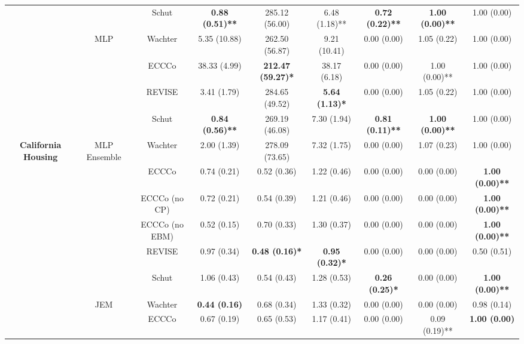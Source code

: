 \begin{table}
{\begin{tabular}[t]{>{}c|c|c|c|c|c|c|c|c}
 &  & Schut & \textbf{0.88 (0.51)**} & 285.12 (56.00) & 6.48 (1.18)** & \textbf{0.72 (0.22)**} & \textbf{1.00 (0.00)**} & 1.00 (0.00)\\

 & \multirow{-4}{*}{\centering\arraybackslash MLP} & Wachter & 5.35 (10.88) & 262.50 (56.87) & 9.21 (10.41) & 0.00 (0.00) & 1.05 (0.22) & 1.00 (0.00)\\
\cline{2-9}
 &  & ECCCo & 38.33 (4.99) & \textbf{212.47 (59.27)*} & 38.17 (6.18) & 0.00 (0.00) & 1.00 (0.00)** & 1.00 (0.00)\\

 &  & REVISE & 3.41 (1.79) & 284.65 (49.52) & \textbf{5.64 (1.13)*} & 0.00 (0.00) & 1.05 (0.22) & 1.00 (0.00)\\

 &  & Schut & \textbf{0.84 (0.56)**} & 269.19 (46.08) & 7.30 (1.94) & \textbf{0.81 (0.11)**} & \textbf{1.00 (0.00)**} & 1.00 (0.00)\\

\multirow{-16}{*}{\centering\arraybackslash \textbf{California Housing}} & \multirow{-4}{*}{\centering\arraybackslash MLP Ensemble} & Wachter & 2.00 (1.39) & 278.09 (73.65) & 7.32 (1.75) & 0.00 (0.00) & 1.07 (0.23) & 1.00 (0.00)\\
\cline{1-9}
 &  & ECCCo & 0.74 (0.21) & 0.52 (0.36) & 1.22 (0.46) & 0.00 (0.00) & 0.00 (0.00) & \textbf{1.00 (0.00)**}\\

 &  & ECCCo (no CP) & 0.72 (0.21) & 0.54 (0.39) & 1.21 (0.46) & 0.00 (0.00) & 0.00 (0.00) & \textbf{1.00 (0.00)**}\\

 &  & ECCCo (no EBM) & 0.52 (0.15) & 0.70 (0.33) & 1.30 (0.37) & 0.00 (0.00) & 0.00 (0.00) & \textbf{1.00 (0.00)**}\\

 &  & REVISE & 0.97 (0.34) & \textbf{0.48 (0.16)*} & \textbf{0.95 (0.32)*} & 0.00 (0.00) & 0.00 (0.00) & 0.50 (0.51)\\

 &  & Schut & 1.06 (0.43) & 0.54 (0.43) & 1.28 (0.53) & \textbf{0.26 (0.25)*} & 0.00 (0.00) & \textbf{1.00 (0.00)**}\\

 & \multirow{-6}{*}{\centering\arraybackslash JEM} & Wachter & \textbf{0.44 (0.16)} & 0.68 (0.34) & 1.33 (0.32) & 0.00 (0.00) & 0.00 (0.00) & 0.98 (0.14)\\
\cline{2-9}
 &  & ECCCo & 0.67 (0.19) & 0.65 (0.53) & 1.17 (0.41) & 0.00 (0.00) & 0.09 (0.19)** & \textbf{1.00 (0.00)}\\


\end{tabular}}
\end{table}
